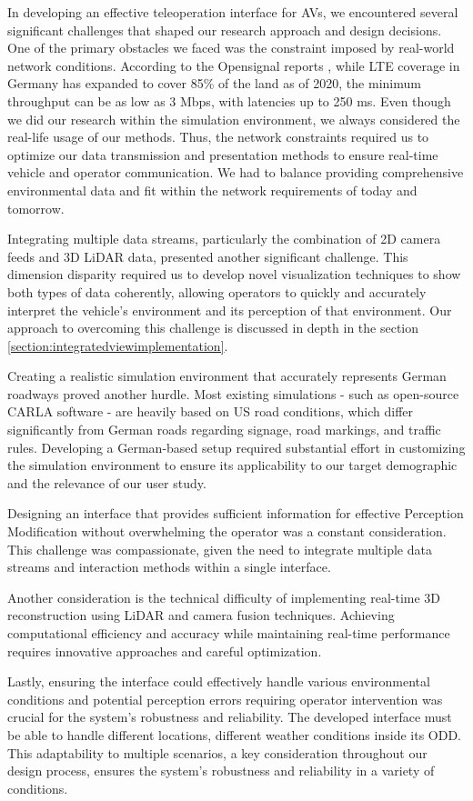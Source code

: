 In developing an effective teleoperation interface for \acp{AV}, we encountered several significant challenges that shaped our research approach and design decisions.
One of the primary obstacles we faced was the constraint imposed by real-world network conditions.
According to the Opensignal reports \cite{opensignal2020germany}, while LTE coverage in Germany has expanded to cover 85\% of the land as of 2020,
the minimum throughput can be as low as 3 Mbps, with latencies up to 250 ms. Even though we did our research within the simulation environment,
we always considered the real-life usage of our methods. Thus, the network constraints required us to optimize our data transmission and presentation methods to ensure
real-time vehicle and operator communication. We had to balance providing comprehensive environmental data and fit within the network requirements of today and tomorrow.

Integrating multiple data streams, particularly the combination of 2D camera feeds and 3D LiDAR data, presented another significant challenge.
This dimension disparity required us to develop novel visualization techniques to show both types of data coherently, allowing operators
to quickly and accurately interpret the vehicle's environment and its perception of that environment. Our approach to overcoming this challenge is
discussed in depth in the section \ref{section:integratedviewimplementation}.

Creating a realistic simulation environment that accurately represents German roadways proved another hurdle. Most existing simulations - such as open-source CARLA software \cite{Dosovitskiy2017CARLAAO} - are heavily based on US road conditions, which differ significantly from German roads regarding signage, road markings, and traffic rules. Developing a German-based setup required substantial effort in customizing the simulation environment to ensure its applicability to our target demographic and the relevance of our user study.

Designing an interface that provides sufficient information for effective Perception Modification without overwhelming the operator was a constant consideration. This challenge was compassionate, given the need to integrate multiple data streams and interaction methods within a single interface.

Another consideration is the technical difficulty of implementing real-time 3D reconstruction using LiDAR and camera fusion techniques. Achieving computational efficiency and accuracy while maintaining real-time performance requires innovative approaches and careful optimization.

Lastly, ensuring the interface could effectively handle various environmental conditions and potential perception errors requiring operator intervention was crucial for the system's robustness and reliability. The developed interface must be able to handle different locations, different weather conditions
inside its \ac{ODD}. This adaptability to multiple scenarios, a key consideration throughout our design process, ensures the system's robustness and reliability in a variety of conditions.
